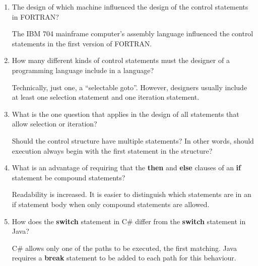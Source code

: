 \begin{enumerate}
  \item The design of which machine influenced the design
    of the control statements in FORTRAN?

  \begin{answer}
    The IBM 704 mainframe computer's assembly language influenced the control 
    statements in the first version of FORTRAN.
    \end{answer}

  \item How many different kinds of control statements
    must the designer of a programming language include
    in a language?

  \begin{answer}
    Technically, just one, a ``selectable goto''. However, designers usually 
    include at least one selection statement and one iteration statement.
    \end{answer}

  \item What is the one question that applies in the
    design of all statements that allow selection or
    iteration?

  \begin{answer}
    Should the control structure have multiple statements? In other words, 
    should execution always begin with the first statement in the structure?
    \end{answer}

  \item What is an advantage of requiring that
    the \textbf{then} and \textbf{else} clauses of
    an \textbf{if} statement be compound statements?

  \begin{answer}
    Readability is increased. It is easier to distinguish which statements are
    in an if statement body when only compound statements are allowed.
    \end{answer}

  \item How does the \textbf{switch} statement in C\#
    differ from the \textbf{switch} statement in Java?

  \begin{answer}
    C\# allows only one of the paths to be executed, the first matching. Java 
    requires a \textbf{break} statement to be added to each path for this 
    behaviour.
    \end{answer}


\end{enumerate}
